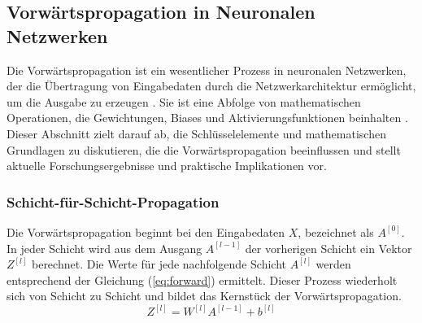 \subsection{Vorwärtspropagation in Neuronalen Netzwerken}
\label{sec: Forward Propagation}
Die Vorwärtspropagation ist ein wesentlicher Prozess in neuronalen Netzwerken, der die Übertragung von Eingabedaten durch die Netzwerkarchitektur ermöglicht, um die Ausgabe zu erzeugen \cite{russell2021ai}. 
Sie ist eine Abfolge von mathematischen Operationen, die Gewichtungen, Biases und Aktivierungsfunktionen beinhalten \cite{Chollet2021}.
Dieser Abschnitt zielt darauf ab, die Schlüsselelemente und mathematischen Grundlagen zu diskutieren, die die Vorwärtspropagation beeinflussen und stellt aktuelle Forschungsergebnisse und praktische Implikationen vor.
%
\subsubsection{Schicht-für-Schicht-Propagation}

Die Vorwärtspropagation beginnt bei den Eingabedaten \( X \), bezeichnet als \( A^{[0]} \). In jeder Schicht wird aus dem Ausgang \( A^{[l-1]} \) der vorherigen Schicht ein Vektor \( Z^{[l]} \) berechnet. Die Werte für jede nachfolgende Schicht \( A^{[l]} \) werden entsprechend der Gleichung (\ref{eq:forward}) ermittelt. Dieser Prozess wiederholt sich von Schicht zu Schicht und bildet das Kernstück der Vorwärtspropagation.
%
\begin{equation}
Z^{[l]} = W^{[l]} A^{[l-1]} + b^{[l]}
\label{eq:forward}
\end{equation}
%
%
%
%
